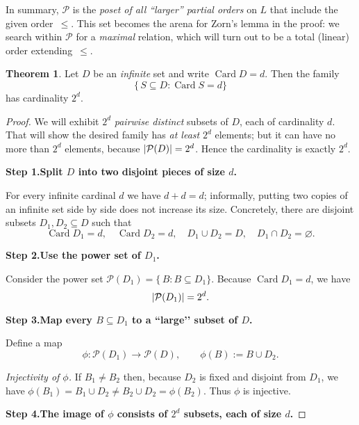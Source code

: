\documentclass[12pt]{article}
\DeclareMathOperator{\card}{Card}
\theoremstyle{definition} %
\newtheorem{theorem}{Theorem}
\theoremstyle{plain} %
\begin{document}
\noindent
In summary, \(\mathcal P\) is the \emph{poset of all “larger” partial orders}
on \(L\) that include the given order~\(\le\).
This set becomes the arena for Zorn’s lemma in the proof:  
we search within \(\mathcal P\) for a \emph{maximal} relation,
which will turn out to be a total (linear) order extending~\(\le\).
\begin{theorem}
  \label{thm:many‑big‑subsets}
  Let \(D\) be an \emph{infinite} set and write \(\card{D}=d\).
  Then the family
  \[
    \bigl\{\,S\subseteq D : \card{S}=d\bigr\}
  \]
  has cardinality \(2^{d}\).
  \end{theorem}
  
  \begin{proof}
  We will exhibit \(2^{d}\) \emph{pairwise distinct} subsets of \(D\),
  each of cardinality \(d\).
  That will show the desired family has \emph{at least} \(2^{d}\) elements;
  but it can have no more than \(2^{d}\) elements, because
  \(\abs{\mathcal P(D)}=2^{d}\).
  Hence the cardinality is exactly \(2^{d}\).
  
  \bigskip
  \textbf{Step 1.\@ Split \(D\) into two disjoint pieces of size \(d\).}
  
  For every infinite cardinal \(d\) we have \(d+d=d\); informally,
  putting two copies of an infinite set side by side does not increase
  its size.  Concretely, there are disjoint subsets
  \(D_{1},D_{2}\subseteq D\) such that
  \[
    \card{D_{1}} = d, 
    \quad
    \card{D_{2}} = d,
    \quad
    D_{1}\cup D_{2}=D,
    \quad
    D_{1}\cap D_{2}=\varnothing.
  \]
  
  \bigskip
  \textbf{Step 2.\@ Use the power set of \(D_{1}\).}
  
  Consider the power set
  \(
    \mathcal P(D_{1})=\{\,B : B\subseteq D_{1}\}.
  \)
  Because \(\card{D_{1}}=d\), we have
  \[
    \abs{\mathcal P(D_{1})}=2^{d}.
  \]
  
  \bigskip
  \textbf{Step 3.\@ Map every \(B\subseteq D_{1}\) to a “large’’ subset of \(D\).}
  
  Define a map
  \[
    \phi : \mathcal P(D_{1}) \longrightarrow \mathcal P(D),
    \qquad
    \phi(B):=B\cup D_{2}.
  \]
  
  \emph{Injectivity of \(\phi\).}
  If \(B_{1}\neq B_{2}\) then, because \(D_{2}\) is fixed and
  disjoint from \(D_{1}\), we have
  \(\phi(B_{1})=B_{1}\cup D_{2}\neq B_{2}\cup D_{2}=\phi(B_{2})\).
  Thus \(\phi\) is injective.
  
  \bigskip
  \textbf{Step 4.\@ The image of \(\phi\) consists of \(2^{d}\) subsets,
  each of size \(d\).}
  

\end{proof}
\end{document}
